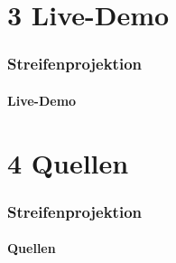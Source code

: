 \documentclass{beamer}
\begin{document}
\section{3 \hspace{5px} Live-Demo} 
\begin{frame}
	\frametitle{Streifenprojektion}
	\framesubtitle{Live-Demo}

\end{frame}


\section{4 \hspace{5px} Quellen} 
\begin{frame}
	\frametitle{Streifenprojektion}
	\framesubtitle{Quellen}
	
\end{frame}
\end{document}
